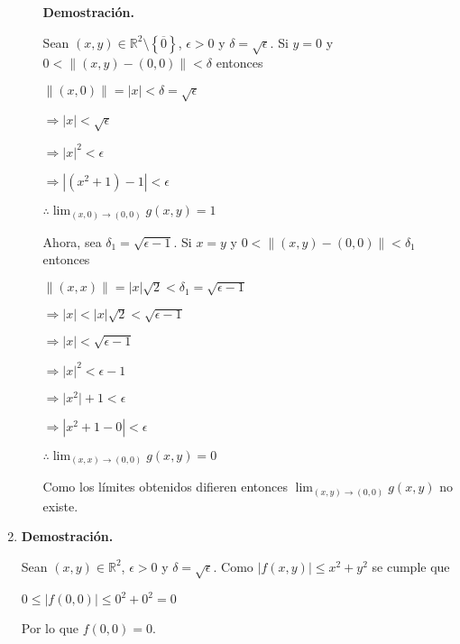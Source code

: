 \documentclass[fleqn]{article}
\begin{document}
\begin{enumerate}
\begin{enumerate}
            \textbf{Demostración.}

            Sean $ (x,y) \in \mathbb{R}^2 \setminus \left\lbrace \overline{0} \right\rbrace $, $ \epsilon > 0 $ y $ \delta = \sqrt{\epsilon} $. Si $ y = 0 $ y $ 0 < \lVert (x,y) - (0,0) \rVert < \delta $ entonces

            $ \lVert (x,0) \rVert = \lvert x \rvert < \delta = \sqrt{\epsilon} $

            $ \Longrightarrow \lvert x \rvert < \sqrt{\epsilon} $

            $ \Longrightarrow \lvert x \rvert^2 < \epsilon $

            $ \Longrightarrow \left\lvert (x^2 + 1) - 1 \right\rvert < \epsilon $

            $ \therefore \displaystyle \lim_{(x,0) \to (0,0)} g(x,y) = 1 $

            Ahora, sea $ \delta_1 = \sqrt{\epsilon - 1} $. Si $ x = y $ y $ 0 < \lVert (x,y) - (0,0) \rVert < \delta_1 $ entonces

            $ \lVert (x,x) \rVert = \lvert x \rvert \sqrt{2} < \delta_1 = \sqrt{\epsilon - 1} $

            $ \Longrightarrow \lvert x \rvert < \lvert x \rvert \sqrt{2} < \sqrt{\epsilon - 1} $

            $ \Longrightarrow \lvert x \rvert < \sqrt{\epsilon - 1} $

            $ \Longrightarrow \lvert x \rvert^2 < \epsilon - 1 $

            $ \Longrightarrow \lvert x^2 \rvert + 1 < \epsilon $

            $ \Longrightarrow \left\lvert x^2 + 1 - 0 \right\rvert < \epsilon $

            $ \therefore \displaystyle \lim_{(x,x) \to (0,0)} g(x,y) = 0 $

            Como los límites obtenidos difieren entonces $ \displaystyle \lim_{(x,y) \to (0,0)} g(x,y) $ no existe.
        \end{enumerate}

        \item \textbf{Demostración.}

        Sean $ (x,y) \in \mathbb{R}^2 $, $ \epsilon > 0 $ y $ \delta = \sqrt{\epsilon} $. Como $ \lvert f(x,y) \rvert \leq x^2 + y^2 $ se cumple que 

        $ 0 \leq \lvert f(0,0) \rvert \leq 0^2 + 0^2 = 0 $

        Por lo que $ f(0,0) = 0 $.


\end{enumerate}
\end{document}
